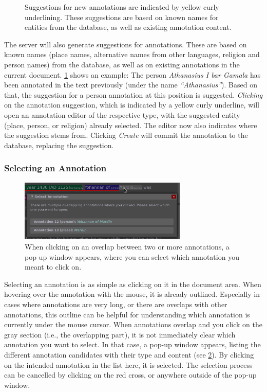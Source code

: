 \begin{figure}[htb]
  \caption{
    Suggestions for new annotations are indicated by yellow curly underlining.
    These suggestions are based on known names for entities from the database, as well as existing annotation content.
  }
  \label{fig:annotation-suggestion}
\end{figure}

The server will also generate suggestions for annotations.
These are based on known names (place names, alternative names from other languages, religion and person names) from the database, as well as on existing annotations in the current document.
\cref{fig:annotation-suggestion} shows an example:
The person \emph{Athanasius I bar Gamala} has been annotated in the text previously (under the name \emph{\enquote{Athanasius}}).
Based on that, the suggestion for a person annotation at this position is suggested.
\emph{Clicking} on the annotation suggestion, which is indicated by a yellow curly underline, will open an annotation editor of the respective type, with the suggested entity (place, person, or religion) already selected.
The editor now also indicates where the suggestion stems from.
Clicking \emph{Create} will commit the annotation to the database, replacing the suggestion.


\subsubsection{Selecting an Annotation}
\label{sec:annotation-selection}

\begin{figure}[htb]
  \centering
  \includegraphics[width=8cm]{../src/assets/annotator-documentation/select-annotation.png}
  \caption{
    When clicking on an overlap between two or more annotations, a pop-up window appears, where you can select which annotation you meant to click on.
  }
  \label{fig:annotation-selection}
\end{figure}

Selecting an annotation is as simple as clicking on it in the document area.
When hovering over the annotation with the mouse, it is already outlined.
Especially in cases where annotations are very long, or there are overlaps with other annotations, this outline can be helpful for understanding which annotation is currently under the mouse cursor.
When annotations overlap and you click on the gray section (i.e., the overlapping part), it is not immediately clear which annotation you want to select.
In that case, a pop-up window appears, listing the different annotation candidates with their type and content (see \cref{fig:annotation-selection}).
By clicking on the intended annotation in the list here, it is selected.
The selection process can be cancelled by clicking on the red cross, or anywhere outside of the pop-up window.


